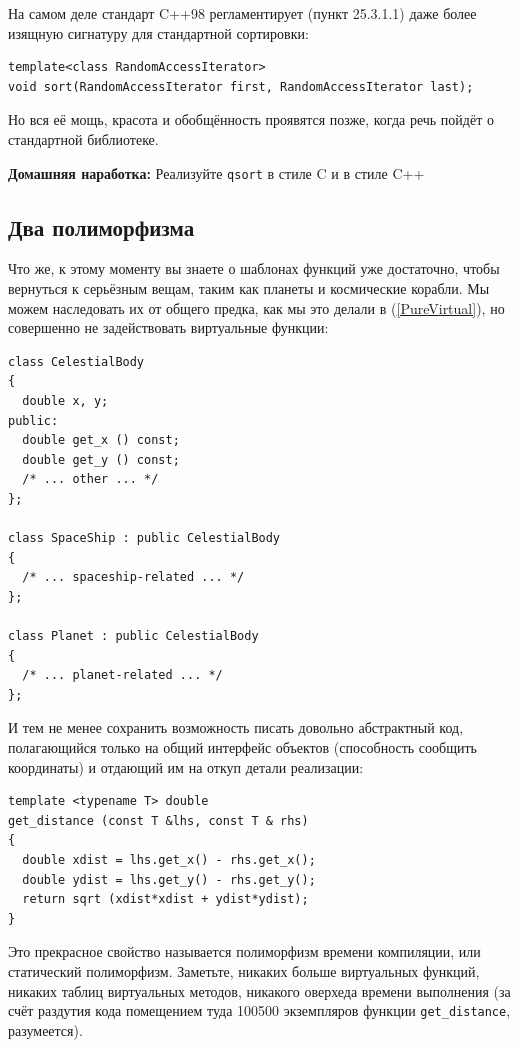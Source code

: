 \documentclass[a4paper,12pt,oneside]{article}
\begin{document}
На самом деле стандарт C++98 регламентирует (пункт 25.3.1.1) даже более изящную сигнатуру для стандартной сортировки:

\begin{lstlisting}
template<class RandomAccessIterator>
void sort(RandomAccessIterator first, RandomAccessIterator last);
\end{lstlisting}

Но вся её мощь, красота и обобщённость проявятся позже, когда речь пойдёт о стандартной библиотеке.

\textbf{Домашняя наработка:} Реализуйте \lstinline!qsort! в стиле C и в стиле C++

\subsection{Два полиморфизма}

Что же, к этому моменту вы знаете о шаблонах функций уже достаточно, чтобы вернуться к серьёзным вещам, таким как планеты и космические корабли. Мы можем наследовать их от общего предка, как мы это делали в (\ref{PureVirtual}), но совершенно не задействовать виртуальные функции:

\begin{lstlisting}
class CelestialBody
{
  double x, y;
public:
  double get_x () const;
  double get_y () const;
  /* ... other ... */ 
};

class SpaceShip : public CelestialBody
{
  /* ... spaceship-related ... */
};

class Planet : public CelestialBody
{
  /* ... planet-related ... */
};
\end{lstlisting}

И тем не менее сохранить возможность писать довольно абстрактный код, полагающийся только на общий интерфейс объектов (способность сообщить координаты) и отдающий им на откуп детали реализации:

\begin{lstlisting}
template <typename T> double
get_distance (const T &lhs, const T & rhs)
{
  double xdist = lhs.get_x() - rhs.get_x();
  double ydist = lhs.get_y() - rhs.get_y();
  return sqrt (xdist*xdist + ydist*ydist);
}
\end{lstlisting}

Это прекрасное свойство называется полиморфизм времени компиляции, или статический полиморфизм. Заметьте, никаких больше виртуальных функций, никаких таблиц виртуальных методов, никакого оверхеда времени выполнения (за счёт раздутия кода помещением туда 100500 экземпляров функции \lstinline!get_distance!, разумеется).
\end{document}
